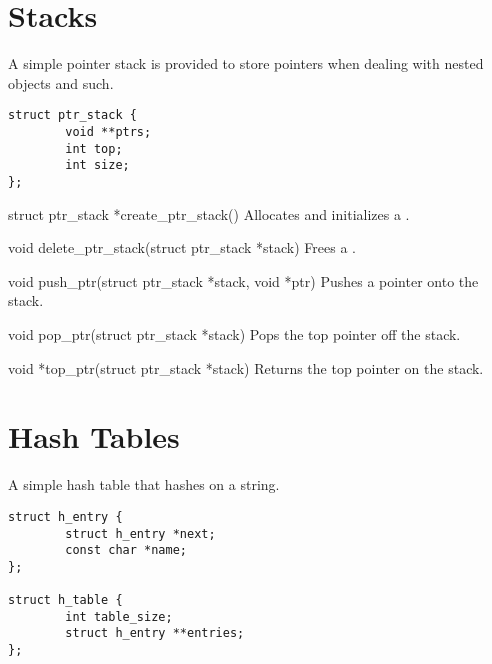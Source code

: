 

\section{Stacks}
\label{sec:libcompiler:Stacks}

A simple pointer stack is provided to store pointers when dealing with nested
objects and such.

\begin{verbatim}
struct ptr_stack {
        void **ptrs;
        int top;
        int size;
};
\end{verbatim}

\begin{cprototypelist}
  \item[struct ptr_stack *create_ptr_stack()] Allocates and
  initializes a .

  \item[void delete_ptr_stack(struct ptr_stack *stack)] Frees a
  .

  \item[void push_ptr(struct ptr_stack *stack, void *ptr)] Pushes
  a pointer onto the stack.

  \item[void pop_ptr(struct ptr_stack *stack)] Pops the top
  pointer off the stack.

  \item[void *top_ptr(struct ptr_stack *stack)] Returns the top
  pointer on the stack.
\end{cprototypelist}



\section{Hash Tables}
\label{sec:libcompiler:Hash Tables}

A simple hash table that hashes on a string.

\begin{verbatim}
struct h_entry {
        struct h_entry *next;
        const char *name;
};

struct h_table {
        int table_size;
        struct h_entry **entries;
};
\end{verbatim}

